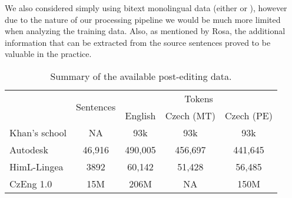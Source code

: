 We also considered simply using bitext monolingual data (either 
or ), however due to the nature of our processing
pipeline we would be much more limited when analyzing the training data. Also, as
mentioned by Rosa\cite{depfix:2014}, the additional information that can be
extracted from the source
sentences proved to be valuable in the practice.


\begin{table*}[t]
\centering
\small

\begin{tabular}{lcccc}
\multirow{2}{*}{}  &  \multirow{2}{*}{\hash{} Sentences}  &  \multicolumn{3}{c}{\hash{} Tokens}  \\
&   & English & Czech (MT) & Czech (PE) \\
\hline
Khan's school & NA & \tilda{}93k & \tilda{}93k & \tilda{}93k \\
Autodesk & 46,916 & 490,005 & 456,697 & 441,645 \\
HimL-Lingea & 3892 & 60,142 & 51,428 & 56,485 \\
CzEng 1.0 & 15M & 206M & NA & 150M \\
\end{tabular}
\caption{Summary of the available post-editing data.
}
\label{avail-data}
\end{table*}



